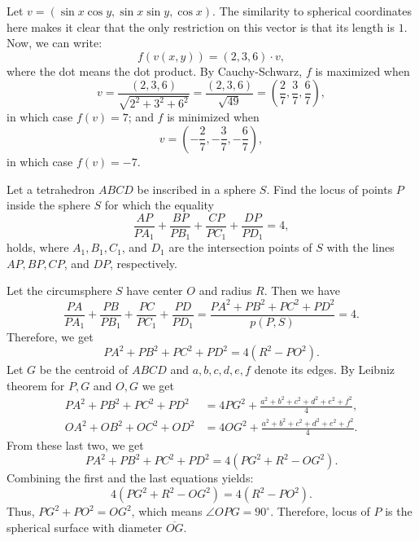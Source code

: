 \begin{solution}[name={Solution by Facis}] 
	Let $v = (\sin x \cos y, \sin x \sin y, \cos x)$. The similarity to spherical coordinates here makes it clear that the only restriction on this vector is that its length is $1$. Now, we can write:
	\[f(v(x,y)) = (2,3,6) \cdot v,\]
	where the dot means the dot product. By Cauchy-Schwarz, $f$ is maximized when \[v = \frac{(2,3,6)}{\sqrt{2^2+3^2+6^2}} =\frac{(2,3,6) }{ \sqrt{49}} = \left(\frac 27, \frac 37, \frac 67\right),\] in which case $f(v) = 7$; and $f$ is minimized when \[v = \left(-\frac 27, -\frac 37, -\frac 67\right),\] in which case $f(v) = -7$.
\end{solution}





\begin{question}
	Let a tetrahedron $ABCD$ be inscribed in a sphere $S$. Find the locus of points $P$ inside the sphere $S$ for which the equality
	\[\frac{AP}{PA_1}+\frac{BP}{PB_1}+\frac{CP}{PC_1}+\frac{DP}{PD_1}=4,\]
	holds, where $A_1,B_1, C_1$, and $D_1$ are the intersection points of $S$ with the lines $AP,BP,CP$, and $DP$, respectively.
\end{question}





\begin{solution}[name={Solution by Luis González}] 
	Let the circumsphere $S$ have center $O$ and radius $R.$ Then we have
	\[\frac{PA}{PA_1}+\frac{PB}{PB_1}+\frac{PC}{PC_1}+\frac{PD}{PD_1}=\frac{PA^2+PB^2+PC^2+PD^2}{p(P,S)}=4.\]
	Therefore, we get 
	$$ PA^2+PB^2+PC^2+PD^2=4(R^2-PO^2).$$
	Let $G$ be the centroid of $ABCD$ and $a,b,c,d,e,f$ denote its edges. By Leibniz theorem for $P,G$ and $O,G$ we get
	\begin{align*}
		PA^2+PB^2+PC^2+PD^2 &= 4PG^2+\frac{a^2+b^2+c^2+d^2+e^2+f^2}{4},\\
		OA^2+OB^2+OC^2+OD^2 & =4OG^2+\frac{a^2+b^2+c^2+d^2+e^2+f^2}{4}.
	\end{align*}
	From these last two, we get \[PA^2+PB^2+PC^2+PD^2=4(PG^2+R^2-OG^2).\]
	Combining the first and the last equations yields: $$4(PG^2+R^2-OG^2)=4(R^2-PO^2).$$
	Thus, $ PG^2+PO^2=OG^2$, which means $\angle OPG=90^{\circ}$. Therefore, locus of $P$ is the spherical surface with diameter $\overline{OG}$.
\end{solution}








